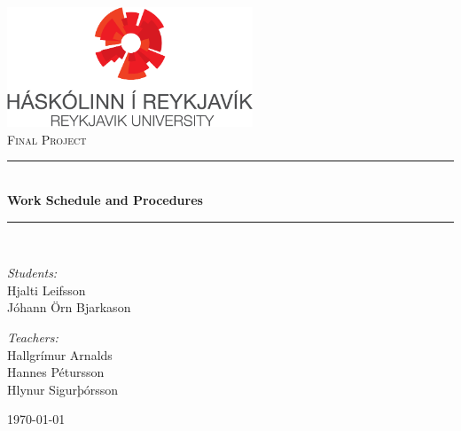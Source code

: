  \newcommand{\HRule}{\rule{\linewidth}{0.5mm}}
\begin{titlepage}

\begin{center}
\includegraphics[width=0.55\textwidth]{./rulogo}\\[4.0cm]    


\textsc{\LARGE Final Project}\\[0.5cm]

\HRule \\[0.4cm]
{ \Huge \bfseries Work Schedule and Procedures}\\[0.4cm]

\HRule \\[1.5cm]


\begin{minipage}{0.49\textwidth}
\begin{flushleft} \large
\emph{Students:}\\
Hjalti Leifsson \\
Jóhann Örn Bjarkason
\end{flushleft}
\end{minipage}
\begin{minipage}{0.49\textwidth}
\begin{flushright} \large
\emph{Teachers:} \\
Hallgrímur Arnalds \\
Hannes Pétursson \\
Hlynur Sigurþórsson
\end{flushright}
\end{minipage}

\vfill

{\large \today}



\end{center}

\end{titlepage}